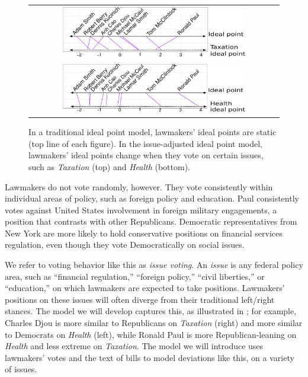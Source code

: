\begin{figure}
  \center
  \begin{tabular}{c}
  \includegraphics[width=0.75\textwidth]{chapter_spatial_voting_with_text/figures/3393_example_ideal_points_taxation.pdf} \\
  \includegraphics[width=0.75\textwidth]{chapter_spatial_voting_with_text/figures/3393_example_ideal_points_health.pdf} \\
  \end{tabular}
  \caption{In a traditional ideal point model, lawmakers' ideal points
    are static (top line of each figure).  In the issue-adjusted ideal point model, lawmakers'
    ideal points change when they vote on certain issues, such as
    \emph{Taxation} (top) and \emph{Health} (bottom).}
  \label{fig:moving_ideal_points}
\end{figure}

Lawmakers do not vote randomly, however.  They vote consistently
within individual areas of policy, such as foreign policy and
education.  Paul consistently votes against United States involvement
in foreign military engagements, a position that contrasts with other
Republicans.  Democratic representatives from New York are more likely
to hold conservative positions on financial services regulation, even
though they vote Democratically on social issues.

We refer to voting behavior like this as \emph{issue voting}.  An
\emph{issue} is any federal policy area, such as ``financial
regulation,'' ``foreign policy,'' ``civil liberties,'' or
``education,'' on which lawmakers are expected to take positions.
Lawmakers' positions on these issues will often diverge from their
traditional left/right stances.  The model we will develop captures
this, as illustrated in ; for
example, Charles Djou is more similar to Republicans on
\emph{Taxation} (right) and more similar to Democrats on \emph{Health}
(left), while Ronald Paul is more Republican-leaning on \emph{Health}
and less extreme on \emph{Taxation}. The model we will introduce uses
lawmakers' votes and the text of bills to model deviations like this,
on a variety of issues.

